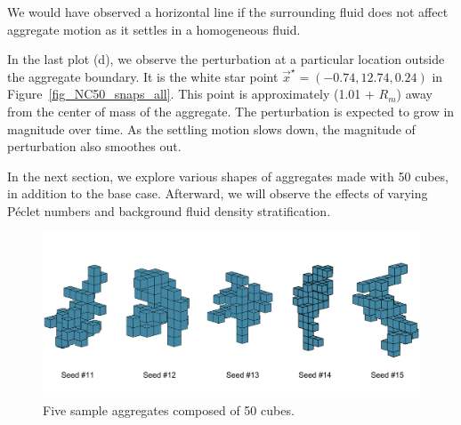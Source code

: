 We would have observed a horizontal line if the surrounding fluid does not affect aggregate motion as it settles in a homogeneous fluid. 
\par
In the last plot (d), we observe the perturbation at a particular location outside the aggregate boundary. It is the white star point $\vec{x}^{\star} = (-0.74, 12.74, 0.24)$ in Figure~\ref{fig_NC50_snaps_all}. This point is approximately (1.01 + $R_m$) away from the center of mass of the aggregate. The perturbation is expected to grow in magnitude over time. As the settling motion slows down, the magnitude of perturbation also smoothes out. 
\par
In the next section, we explore various shapes of aggregates made with 50 cubes, in addition to the base case. Afterward, we will observe the effects of varying Péclet numbers and background fluid density stratification. 
\begin{figure}[ht]
	\begin{center}
		\includegraphics[scale=0.45]{./figures/fig_seed11_15_all.pdf}
	\caption{Five sample aggregates composed of 50 cubes.}
	\label{fig_seed11_15_all}
\end{center}
\end{figure}
\par
